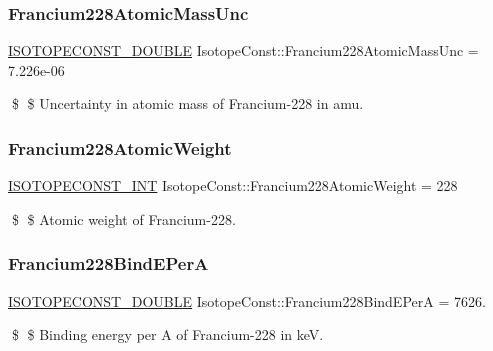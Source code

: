 \subsubsection{\texorpdfstring{Francium228\+Atomic\+Mass\+Unc}{Francium228AtomicMassUnc}}
{\footnotesize\ttfamily \mbox{\hyperlink{group___isotope_const-_macros_ga8f45a7272ce02c0b4c65c44636ed719a}{I\+S\+O\+T\+O\+P\+E\+C\+O\+N\+S\+T\+\_\+\+D\+O\+U\+B\+LE}} Isotope\+Const\+::\+Francium228\+Atomic\+Mass\+Unc = 7.\+226e-\/06}

\$ \$ Uncertainty in atomic mass of Francium-\/228 in amu. \mbox{\label{group___isotope_const-_francium-_fr228_gad6df93887608bb7ac4b86e529f8dc3a0}} 
\subsubsection{\texorpdfstring{Francium228\+Atomic\+Weight}{Francium228AtomicWeight}}
{\footnotesize\ttfamily \mbox{\hyperlink{group___isotope_const-_macros_ga5f18360b3e99483a35c32d789e62621c}{I\+S\+O\+T\+O\+P\+E\+C\+O\+N\+S\+T\+\_\+\+I\+NT}} Isotope\+Const\+::\+Francium228\+Atomic\+Weight = 228}

\$ \$ Atomic weight of Francium-\/228. \mbox{\label{group___isotope_const-_francium-_fr228_ga02119326807fd31c9864a75e023d3c41}} 
\subsubsection{\texorpdfstring{Francium228\+Bind\+E\+PerA}{Francium228BindEPerA}}
{\footnotesize\ttfamily \mbox{\hyperlink{group___isotope_const-_macros_ga8f45a7272ce02c0b4c65c44636ed719a}{I\+S\+O\+T\+O\+P\+E\+C\+O\+N\+S\+T\+\_\+\+D\+O\+U\+B\+LE}} Isotope\+Const\+::\+Francium228\+Bind\+E\+PerA = 7626.}

\$ \$ Binding energy per A of Francium-\/228 in keV. \mbox{\label{group___isotope_const-_francium-_fr228_gaa80751c6a594f9ebefc91ee593d34b1a}} 
